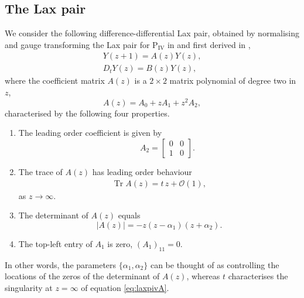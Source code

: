 \documentclass[a4paper,reqno]{amsart}
\numberwithin{equation}{section}
\numberwithin{figure}{section}
\theoremstyle{remark}
\newcommand\Pfour{\textrm{P}_{\textrm{IV}}}
\begin{document}
\subsection{The Lax pair}\label{subsect:linP4}
We consider the following difference-differential Lax pair, obtained by normalising and gauge transforming the Lax pair for $\Pfour$ in \cite{nakazono_lax} and first derived in \cite{adler94},
\begin{subequations}\label{eq:laxpiv}
\begin{align}
    Y(z+1)=A(z)Y(z),\label{eq:laxpivA}\\
    D_t Y(z)=B(z)Y(z),\label{eq:laxpivB}
\end{align}
\end{subequations}
where the coefficient matrix $A(z)$ is a $2\times 2$ matrix polynomial of degree two in $z$,
\begin{equation}\label{eq:pivAseries}
        A(z)=A_0+z A_1+z^2A_2,
    \end{equation}
    characterised by the following four properties.
\begin{enumerate}[label=(\roman*)]
\item The leading order coefficient is given by
\begin{equation*}
    \qquad A_2=\begin{bmatrix}
            0 & 0\\
            1 & 0
        \end{bmatrix}.
\end{equation*}
    \item The trace of $A(z)$ has leading order behaviour
   \begin{equation}\label{eq:traceinfpiv}
    \begin{aligned}
     \operatorname{Tr}A(z)=t\, z+\mathcal{O}(1),
    \end{aligned}
   \end{equation}
    as $z\rightarrow \infty$.
    \item The determinant of $A(z)$ equals
\begin{equation}\label{eq:coefmatrixdetpiv}
    |A(z)|=-z(z-\alpha_1)(z+\alpha_2).
\end{equation}
\item The top-left entry of $A_1$ is zero, $(A_1)_{11}=0$. 
\end{enumerate}
In other words, the parameters $\{\alpha_1,\alpha_2\}$ can be thought of as controlling the locations of the zeros of the determinant of $A(z)$, whereas $t$ characterises the singularity at $z=\infty$ of equation \eqref{eq:laxpivA}.
\end{document}
